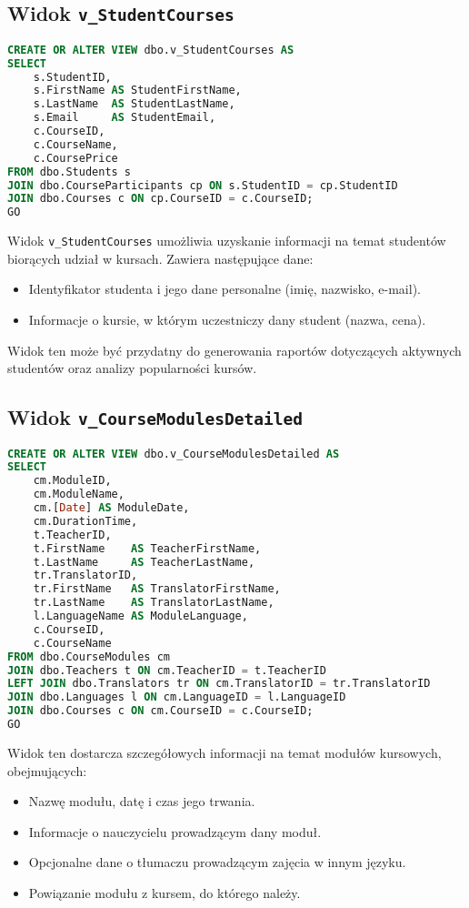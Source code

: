 \documentclass[12pt]{article}
\begin{document}
\subsection{Widok \texttt{v\_StudentCourses}}

\begin{lstlisting}[language=SQL]
CREATE OR ALTER VIEW dbo.v_StudentCourses AS
SELECT
    s.StudentID,
    s.FirstName AS StudentFirstName,
    s.LastName  AS StudentLastName,
    s.Email     AS StudentEmail,
    c.CourseID,
    c.CourseName,
    c.CoursePrice
FROM dbo.Students s
JOIN dbo.CourseParticipants cp ON s.StudentID = cp.StudentID
JOIN dbo.Courses c ON cp.CourseID = c.CourseID;
GO
\end{lstlisting}

\noindent Widok \texttt{v\_StudentCourses} umożliwia uzyskanie informacji na temat studentów biorących udział w kursach. Zawiera następujące dane:
\begin{itemize}
    \item Identyfikator studenta i jego dane personalne (imię, nazwisko, e-mail).
    \item Informacje o kursie, w którym uczestniczy dany student (nazwa, cena).
\end{itemize}
\noindent Widok ten może być przydatny do generowania raportów dotyczących aktywnych studentów oraz analizy popularności kursów.



\subsection{Widok \texttt{v\_CourseModulesDetailed}}

\begin{lstlisting}[language=SQL]
CREATE OR ALTER VIEW dbo.v_CourseModulesDetailed AS
SELECT
    cm.ModuleID,
    cm.ModuleName,
    cm.[Date] AS ModuleDate,
    cm.DurationTime,
    t.TeacherID,
    t.FirstName    AS TeacherFirstName,
    t.LastName     AS TeacherLastName,
    tr.TranslatorID,
    tr.FirstName   AS TranslatorFirstName,
    tr.LastName    AS TranslatorLastName,
    l.LanguageName AS ModuleLanguage,
    c.CourseID,
    c.CourseName
FROM dbo.CourseModules cm
JOIN dbo.Teachers t ON cm.TeacherID = t.TeacherID
LEFT JOIN dbo.Translators tr ON cm.TranslatorID = tr.TranslatorID
JOIN dbo.Languages l ON cm.LanguageID = l.LanguageID
JOIN dbo.Courses c ON cm.CourseID = c.CourseID;
GO
\end{lstlisting}

\noindent Widok ten dostarcza szczegółowych informacji na temat modułów kursowych, obejmujących:
\begin{itemize}
    \item Nazwę modułu, datę i czas jego trwania.
    \item Informacje o nauczycielu prowadzącym dany moduł.
    \item Opcjonalne dane o tłumaczu prowadzącym zajęcia w innym języku.
    \item Powiązanie modułu z kursem, do którego należy.
\end{itemize}
\end{document}
